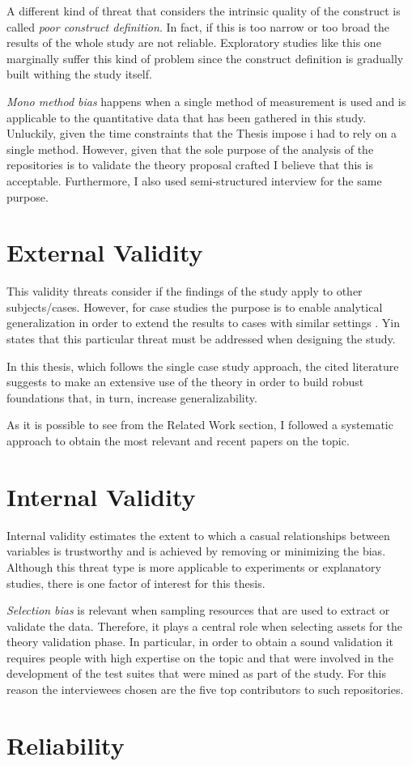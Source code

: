     A different kind of threat that considers the intrinsic quality of the construct is called \textit{poor construct definition}. In fact, if this is too narrow or too broad the results of the whole study are not reliable. Exploratory studies like this one marginally suffer this kind of problem since the construct definition is gradually built withing the study itself.
    
    \textit{Mono method bias} happens when a single method of measurement is used and is applicable to the quantitative data that has been gathered in this study. Unluckily, given the time constraints that the Thesis impose i had to rely on a single method. However, given that the sole purpose of the analysis of the repositories is to validate the theory proposal crafted I believe that this is acceptable. Furthermore, I also used semi-structured interview for the same purpose.

\section{External Validity}
This validity threats consider if the findings of the study apply to other subjects/cases. However, for case studies the purpose is to enable analytical generalization in order to extend the results to cases with similar settings \cite{case_study_software_engineering}. Yin \cite{case_study_guide} states that this particular threat must be addressed when designing the study.

In this thesis, which follows the single case study approach, the cited literature suggests to make an extensive use of the theory in order to build robust foundations that, in turn, increase generalizability.

As it is possible to see from the Related Work section, I followed a systematic approach to obtain the most relevant and recent papers on the topic.

\section{Internal Validity}
Internal validity estimates the extent to which a casual relationships between variables is trustworthy and is achieved by removing or minimizing the bias. Although this threat type is more applicable to experiments or explanatory studies, there is one factor of interest for this thesis.

\textit{Selection bias} is relevant when sampling resources that are used to extract or validate the data. Therefore, it plays a central role when selecting assets for the theory validation phase. In particular, in order to obtain a sound validation it requires people with high expertise on the topic and that were involved in the development of the test suites that were mined as part of the study. For this reason the interviewees chosen are the five top contributors to such repositories.


\section{Reliability}